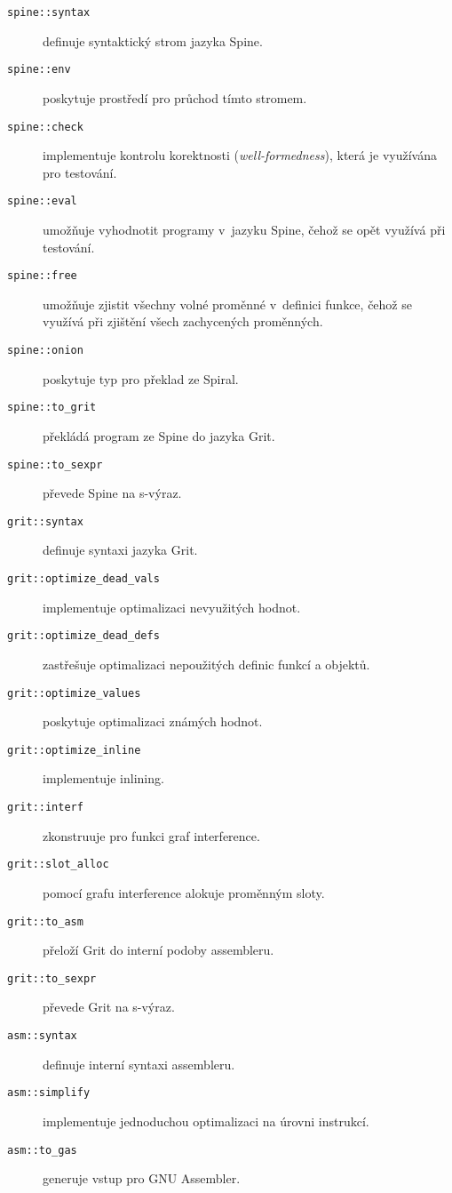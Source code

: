 \begin{description}
  \item[\texttt{spine::syntax}] definuje syntaktický strom jazyka Spine.
  \item[\texttt{spine::env}] poskytuje prostředí pro průchod tímto stromem.
  \item[\texttt{spine::check}] implementuje kontrolu korektnosti
    (\emph{well-formedness}), která je využívána pro testování.
  \item[\texttt{spine::eval}] umožňuje vyhodnotit programy v~jazyku Spine, čehož
    se opět využívá při testování.
  \item[\texttt{spine::free}] umožňuje zjistit všechny volné proměnné v~definici
    funkce, čehož se využívá při zjištění všech zachycených proměnných.
  \item[\texttt{spine::onion}] poskytuje typ  pro překlad ze Spiral.
  \item[\texttt{spine::to_grit}] překládá program ze Spine do jazyka Grit.
  \item[\texttt{spine::to_sexpr}] převede Spine na s-výraz.

  \item[\texttt{grit::syntax}] definuje syntaxi jazyka Grit.
  \item[\texttt{grit::optimize_dead_vals}] implementuje optimalizaci nevyužitých
    hodnot.
  \item[\texttt{grit::optimize_dead_defs}] zastřešuje optimalizaci nepoužitých
    definic funkcí a objektů.
  \item[\texttt{grit::optimize_values}] poskytuje optimalizaci známých hodnot.
  \item[\texttt{grit::optimize_inline}] implementuje inlining.
  \item[\texttt{grit::interf}] zkonstruuje pro funkci graf interference.
  \item[\texttt{grit::slot_alloc}] pomocí grafu interference alokuje proměnným
    sloty.
  \item[\texttt{grit::to_asm}] přeloží Grit do interní podoby assembleru.
  \item[\texttt{grit::to_sexpr}] převede Grit na s-výraz.

  \item[\texttt{asm::syntax}] definuje interní syntaxi assembleru.
  \item[\texttt{asm::simplify}] implementuje jednoduchou optimalizaci na úrovni
    instrukcí.
  \item[\texttt{asm::to_gas}] generuje vstup pro GNU Assembler.
\end{description}

